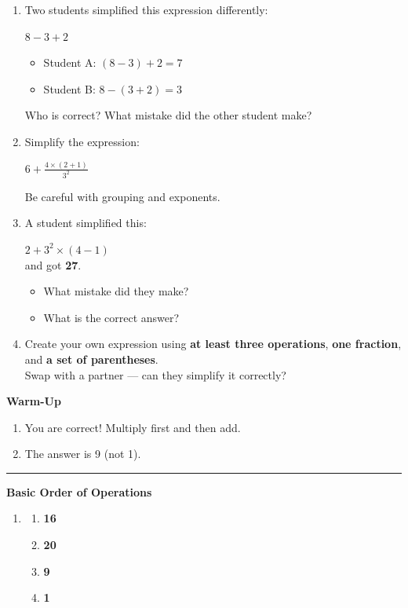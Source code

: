 \documentclass[
  letterpaper,
  DIV=11,
  numbers=noendperiod]{scrreprt}
\providecommand{\tightlist}{%
  \setlength{\itemsep}{0pt}\setlength{\parskip}{0pt}}
\begin{document}
\begin{enumerate}
\def\labelenumi{\arabic{enumi}.}
\setcounter{enumi}{3}
\item
  Two students simplified this expression differently:

  \(8 - 3 + 2\)

  \begin{itemize}
  \tightlist
  \item
    Student A: \((8 - 3) + 2 = 7\)
  \item
    Student B: \(8 - (3 + 2) = 3\)
  \end{itemize}

  Who is correct? What mistake did the other student make?
\item
  Simplify the expression:

  \(6 + \frac{4 \times (2 + 1)}{3^2}\)

  Be careful with grouping and exponents.
\item
  A student simplified this:

  \(2 + 3^2 \times (4 - 1)\)\\
  and got \textbf{27}.

  \begin{itemize}
  \tightlist
  \item
    What mistake did they make?
  \item
    What is the correct answer?
  \end{itemize}
\item
  Create your own expression using \textbf{at least three operations},
  \textbf{one fraction}, and \textbf{a set of parentheses}.\\
  Swap with a partner --- can they simplify it correctly?
\end{enumerate}

\textbf{Warm-Up}

\begin{enumerate}
\def\labelenumi{\arabic{enumi}.}
\item
  You are correct! Multiply first and then add.
\item
  The answer is 9 (not 1).
\end{enumerate}

\begin{center}\rule{0.5\linewidth}{0.5pt}\end{center}

\textbf{Basic Order of Operations}

\begin{enumerate}
\def\labelenumi{\arabic{enumi}.}
\tightlist
\item
  \begin{enumerate}
  \def\labelenumii{\alph{enumii}.}
  \tightlist
  \item
    \textbf{16}
  \item
    \textbf{20}
  \item
    \textbf{9}
  \item
    \textbf{1}
  \end{enumerate}
\end{enumerate}
\end{document}
